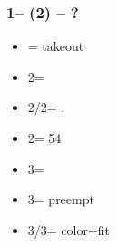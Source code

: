 \documentclass[12pt, a4paper]{article}
\begin{document}
\subsubsection*{1\diams -- (2\clubs) -- ?}
\begin{itemize}
    \item \dbl = takeout
    \item 2\diams = \nat
    \item 2\hearts/2\spades = \nat, \fonce
    \item 2\nt = 54\major
    \item 3\clubs = \diams\ \invp
    \item 3\diams = preempt
    \item 3\hearts/3\spades = color+fit
\end{itemize}

\end{document}
